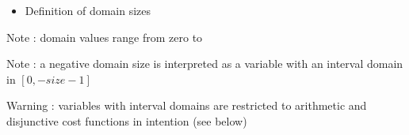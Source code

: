 \documentclass[letterpaper,10pt,openany,oneside,english]{sphinxmanual}
\begin{document}
\begin{fulllineitems}
\begin{itemize}
\item {} 
\sphinxAtStartPar
Definition of domain sizes 
\begin{sphinxVerbatim}[commandchars=\\\{\}]
      
        
\end{sphinxVerbatim}


\end{itemize}


\sphinxAtStartPar
Note : domain values range from zero to  

\sphinxAtStartPar
Note : a negative domain size is interpreted as a variable with an interval domain in \([0,-size-1]\)

\sphinxAtStartPar
Warning : variables with interval domains are restricted to arithmetic and disjunctive cost functions in intention (see below)


\end{fulllineitems}
\end{document}
